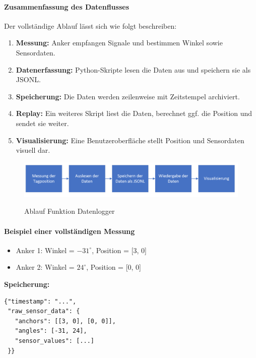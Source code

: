 \documentclass[a4paper, 12pt]{article} %
\begin{document}
\paragraph{Zusammenfassung des Datenflusses}

Der vollständige Ablauf lässt sich wie folgt beschreiben:

\begin{enumerate}
    \item \textbf{Messung:} Anker empfangen Signale und bestimmen Winkel sowie Sensordaten.
    \item \textbf{Datenerfassung:} Python-Skripte lesen die Daten aus und speichern sie als \ac{JSONL}.
    \item \textbf{Speicherung:} Die Daten werden zeilenweise mit Zeitstempel archiviert.
    \item \textbf{Replay:} Ein weiteres Skript liest die Daten, berechnet ggf. die Position und sendet sie weiter.
    \item \textbf{Visualisierung:} Eine Benutzeroberfläche stellt Position und Sensordaten visuell dar.
\end{enumerate}

\begin{figure}[H]
    \includegraphics[width=1\linewidth]{images/Ablauf Funktion Datenlogger.png}\\[1ex]
    \centering
    \caption{Ablauf Funktion Datenlogger}
    \label{ABBILDUNG}
\end{figure}


\paragraph{Beispiel einer vollständigen Messung}

\begin{itemize}
    \item Anker 1: Winkel = \(-31^\circ\), Position = [3, 0]
    \item Anker 2: Winkel = \(24^\circ\), Position = [0, 0]
\end{itemize}

\textbf{Speicherung:}
\begin{verbatim}
{"timestamp": "...", 
 "raw_sensor_data": {
   "anchors": [[3, 0], [0, 0]], 
   "angles": [-31, 24], 
   "sensor_values": [...]
 }}
\end{verbatim}
\end{document}

